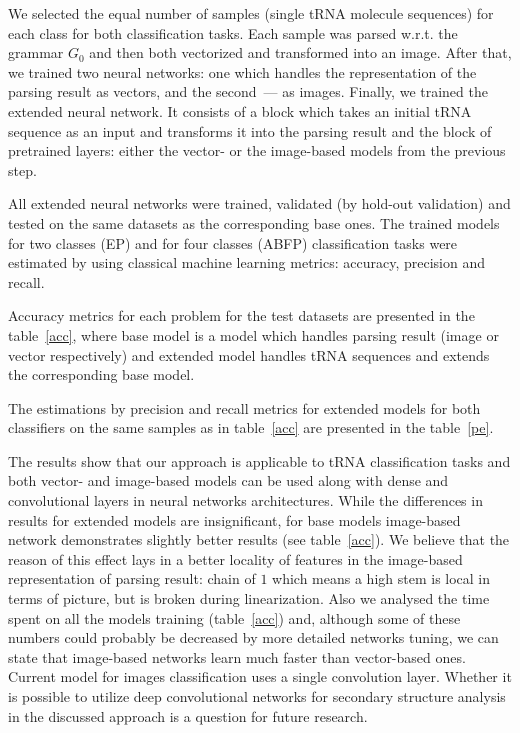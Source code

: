 \documentclass[runningheads]{llncs}
\begin{document}
We selected the equal number of samples (single tRNA molecule sequences) for each class for both classification tasks.
Each sample was parsed w.r.t. the grammar $G_0$ and then both vectorized and transformed into an image.
After that, we trained two neural networks: one which handles the representation of the parsing result as vectors, and the second~--- as images.
Finally, we trained the extended neural network.
It consists of a block which takes an initial tRNA sequence as an input and transforms it into the parsing result and the block of pretrained layers: either the vector- or the image-based models from the previous step. 

All extended neural networks were trained, validated (by hold-out validation) and tested on the same datasets as the corresponding base ones.
The trained models for two classes (EP) and for four classes (ABFP) classification tasks were estimated by using classical machine learning metrics: accuracy, precision and recall.

Accuracy metrics for each problem for the test datasets are presented in the table~\ref{acc}, where base model is a model which handles parsing result (image or vector respectively) and extended model handles tRNA sequences and extends the corresponding base model.



The estimations by precision and recall metrics for extended models for both classifiers on the same samples as in table~\ref{acc} are presented in the table~\ref{pe}.



The results show that our approach is applicable to tRNA classification tasks and both vector- and image-based models can be used along with dense and convolutional layers in neural networks architectures.
While the differences in results for extended models are insignificant, for base models image-based network demonstrates slightly better results (see table~\ref{acc}).
We believe that the reason of this effect lays in a better locality of features in the image-based representation of parsing result: chain of $1$ which means a high stem is local in terms of picture, but is broken during linearization. 
Also we analysed the time spent on all the models training (table~\ref{acc}) and, although some of these numbers could probably be decreased by more detailed networks tuning, we can state that image-based networks learn much faster than vector-based ones.
Current model for images classification uses a single convolution layer.
Whether it is possible to utilize deep convolutional networks for secondary structure analysis in the discussed approach is a question for future research.
\end{document}
